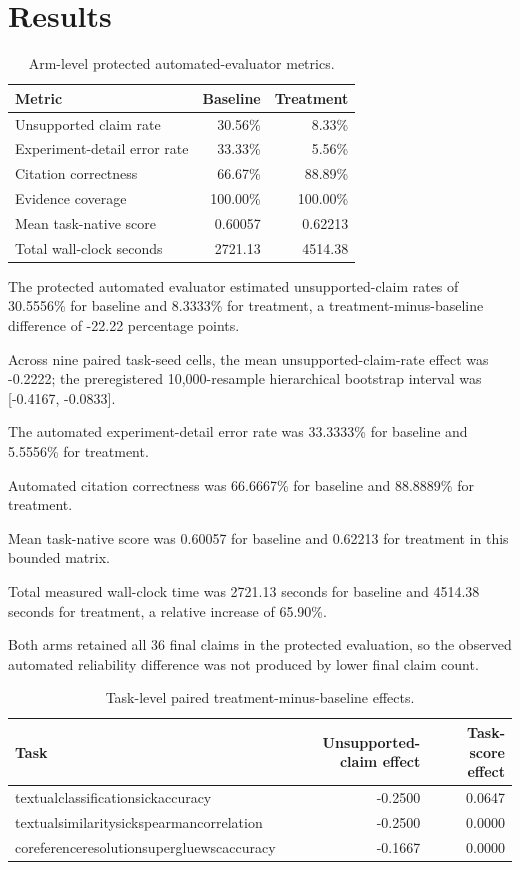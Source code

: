 \documentclass[11pt]{article}
\begin{document}
\section{Results}
\begin{table}[htbp]
\centering
\caption{Arm-level protected automated-evaluator metrics.}
\begin{tabular}{lrr}
\toprule
Metric & Baseline & Treatment \\
\midrule
Unsupported claim rate & 30.56\% & 8.33\% \\ 
Experiment-detail error rate & 33.33\% & 5.56\% \\ 
Citation correctness & 66.67\% & 88.89\% \\ 
Evidence coverage & 100.00\% & 100.00\% \\ 
Mean task-native score & 0.60057 & 0.62213 \\ 
Total wall-clock seconds & 2721.13 & 4514.38 \\ 
\bottomrule
\end{tabular}
\end{table}
The protected automated evaluator estimated unsupported-claim rates of 30.5556\% for baseline and 8.3333\% for treatment, a treatment-minus-baseline difference of -22.22 percentage points.

Across nine paired task-seed cells, the mean unsupported-claim-rate effect was -0.2222; the preregistered 10,000-resample hierarchical bootstrap interval was [-0.4167, -0.0833].

The automated experiment-detail error rate was 33.3333\% for baseline and 5.5556\% for treatment.

Automated citation correctness was 66.6667\% for baseline and 88.8889\% for treatment.

Mean task-native score was 0.60057 for baseline and 0.62213 for treatment in this bounded matrix.

Total measured wall-clock time was 2721.13 seconds for baseline and 4514.38 seconds for treatment, a relative increase of 65.90\%.

Both arms retained all 36 final claims in the protected evaluation, so the observed automated reliability difference was not produced by lower final claim count.

\begin{table}[htbp]
\centering\small
\caption{Task-level paired treatment-minus-baseline effects.}
\begin{tabular}{lrr}
\toprule
Task & Unsupported-claim effect & Task-score effect \\
\midrule
textualclassificationsickaccuracy & -0.2500 & 0.0647 \\
textualsimilaritysickspearmancorrelation & -0.2500 & 0.0000 \\
coreferenceresolutionsupergluewscaccuracy & -0.1667 & 0.0000 \\
\bottomrule
\end{tabular}
\end{table}
\end{document}

